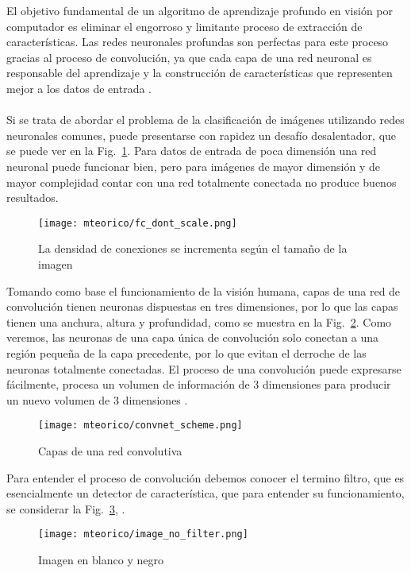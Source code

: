     El objetivo fundamental de un algoritmo de aprendizaje profundo en visión por computador es eliminar el engorroso y limitante proceso de extracción de características. Las redes neuronales profundas son perfectas para este proceso gracias al proceso de convolución, ya que cada capa de una red neuronal es responsable del aprendizaje y la construcción de características que representen mejor a los datos de entrada \cite{dlBook}.
    \\\\
    Si se trata de abordar el problema de la clasificación de imágenes utilizando redes neuronales comunes, puede presentarse con rapidez un desafío desalentador, que se puede ver en la Fig.~\ref{fig:fc_dont_scale}. Para datos de entrada de poca dimensión una red neuronal puede funcionar bien, pero para imágenes de mayor dimensión y de mayor complejidad contar con una red totalmente conectada no produce buenos resultados.
    \begin{figure}[htp]
        \centering
        \texttt{[image: mteorico/fc\_dont\_scale.png]}
        \caption{La densidad de conexiones se incrementa según el tamaño de la imagen}
        \label{fig:fc_dont_scale}
    \end{figure}

    Tomando como base el funcionamiento de la visión humana, capas de una red de convolución tienen neuronas dispuestas en tres dimensiones, por lo que las capas tienen una anchura, altura y profundidad, como se muestra en la Fig.~\ref{fig:convnet_scheme}. Como veremos, las neuronas de una capa única de convolución solo conectan a una región pequeña de la capa precedente, por lo que evitan el derroche de las neuronas totalmente conectadas. El proceso de una convolución puede expresarse fácilmente, procesa un volumen de información de 3 dimensiones para producir un nuevo volumen de 3 dimensiones \cite{dlBook}.
    \begin{figure}[htp]
        \centering
        \texttt{[image: mteorico/convnet\_scheme.png]}
        \caption{Capas de una red convolutiva}
        \label{fig:convnet_scheme}
    \end{figure}

    Para entender el proceso de convolución debemos conocer el termino filtro, que es esencialmente un detector de característica, que para entender su funcionamiento, se considerar la Fig.~\ref{fig:image_no_filter}, \cite{dlBook}.
    \begin{figure}[htp]
        \centering
        \texttt{[image: mteorico/image\_no\_filter.png]}
        \caption{Imagen en blanco y negro}
        \label{fig:image_no_filter}
    \end{figure}

